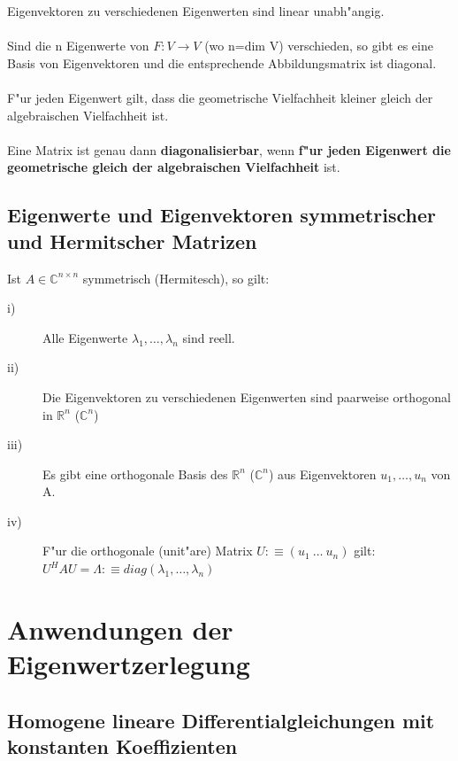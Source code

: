 \documentclass[10pt, a4paper, twocolumn]{scrartcl}
\begin{document}
Eigenvektoren zu verschiedenen Eigenwerten sind linear unabh"angig.\\\\

Sind die n Eigenwerte von $F:V\rightarrow V$ (wo n=dim V) verschieden, so gibt es eine Basis von Eigenvektoren und die entsprechende Abbildungsmatrix ist diagonal.\\\\

F"ur jeden Eigenwert gilt, dass die geometrische Vielfachheit kleiner gleich der algebraischen Vielfachheit ist.\\\\


Eine Matrix ist genau dann {\bf diagonalisierbar}, wenn {\bf f"ur jeden Eigenwert die geometrische gleich der algebraischen Vielfachheit} ist.

\subsection{Eigenwerte und Eigenvektoren symmetrischer und Hermitscher Matrizen}

Ist $A \in \mathbb{C}^{n \times n}$ symmetrisch (Hermitesch), so gilt:\\
\begin{description}
 \item[i)] Alle Eigenwerte $\lambda_1,\ldots,\lambda_n$ sind reell.
 \item[ii)] Die Eigenvektoren zu verschiedenen Eigenwerten sind paarweise orthogonal in $\mathbb{R}^n$ ($\mathbb{C}^n$)
 \item[iii)] Es gibt eine orthogonale Basis des $\mathbb{R}^n$ ($\mathbb{C}^n$) aus Eigenvektoren $u_1,\ldots,u_n$ von A.
 \item[iv)] F"ur die orthogonale (unit"are) Matrix $U :\equiv (u_1\:\ldots\: u_n)$ gilt:\\
  $U^HAU=\Lambda:\equiv diag(\lambda_1,\ldots,\lambda_n)$
\end{description}



\section{Anwendungen der Eigenwertzerlegung}

\subsection{Homogene lineare Differentialgleichungen mit konstanten Koeffizienten}
\end{document}
